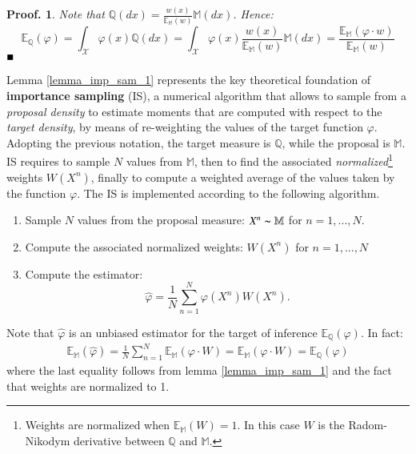 \documentclass[
]{book}
\theoremstyle{break}
\theoremstyle{nonumberplain}
\newtheorem{proof*}{Proof.}
\begin{document}
\begin{proof*}
Note that $\mathbb Q(dx)=\frac{w(x)}{\mathbb E_\mathbb M(w)}\mathbb M(dx)$. Hence:
\begin{equation*}
    \mathbb E_\mathbb Q(\varphi)=\int_\mathcal X\varphi(x)\mathbb Q(dx)=\int_\mathcal X\varphi(x)\frac{w(x)}{\mathbb E_\mathbb M(w)}\mathbb M(dx)=\frac{\mathbb E_\mathbb M(\varphi \cdot w)}{\mathbb E_\mathbb M(w)}
\end{equation*}
$\hfill\blacksquare$
\end{proof*}

Lemma \ref{lemma_imp_sam_1} represents the key theoretical foundation of
\textbf{importance sampling} (IS), a numerical algorithm that allows to
sample from a \textit{proposal density} to estimate moments that are
computed with respect to the \textit{target density}, by means of
re-weighting the values of the target function \(\varphi\).\\
Adopting the previous notation, the target measure is \(\mathbb Q\),
while the proposal is \(\mathbb M\). IS requires to sample \(N\) values
from \(\mathbb M\), then to find the associated
\textit{normalized}\footnote{Weights are normalized when $\mathbb E_\mathbb M(W)=1$. In this case $W$ is the Radom-Nikodym derivative between $\mathbb Q$ and $\mathbb M$.}
weights \(W(X^n)\), finally to compute a weighted average of the values
taken by the function \(\varphi\). The IS is implemented according to
the following algorithm.

\begin{enumerate}
    \item Sample $N$ values from the proposal measure: $X^n\thicksim \mathbb M$ for $n=1,...,N$.
    \item Compute the associated normalized weights: $W(X^n)$ for $n=1,...,N$
    \item Compute the estimator:
    \begin{equation*}
        \hat \varphi= \frac{1}{N} \sum_{n=1}^N\varphi (X^n)W(X^n).
    \end{equation*}
\end{enumerate}

Note that \(\hat \varphi\) is an unbiased estimator for the target of
inference \(\mathbb E_\mathbb Q(\varphi)\). In fact: \begin{equation*}
    \begin{split}
        \mathbb E_\mathbb M(\hat \varphi)=\frac{1}{N} \sum_{n=1}^N \mathbb E_\mathbb M(\varphi \cdot W)=\mathbb E_\mathbb M(\varphi \cdot W)=\mathbb E_\mathbb Q(\varphi)
    \end{split}
\end{equation*} where the last equality follows from lemma
\ref{lemma_imp_sam_1} and the fact that weights are normalized to 1.
\end{document}
